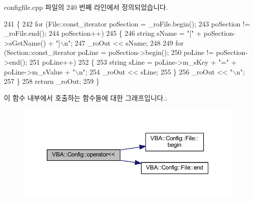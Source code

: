 configfile.\+cpp 파일의 240 번째 라인에서 정의되었습니다.


\begin{DoxyCode}
241 \{
242   \textcolor{keywordflow}{for} (File::const\_iterator poSection = \_roFile.begin();
243        poSection != \_roFile.end();
244        poSection++)
245   \{
246     \textcolor{keywordtype}{string} sName = \textcolor{stringliteral}{"["} + poSection->sGetName() + \textcolor{stringliteral}{"]\(\backslash\)n"};
247     \_roOut << sName;
248 
249     \textcolor{keywordflow}{for} (Section::const\_iterator poLine = poSection->begin();
250          poLine != poSection->end();
251          poLine++)
252     \{
253       \textcolor{keywordtype}{string} sLine = poLine->m\_sKey + \textcolor{stringliteral}{"="} + poLine->m\_sValue + \textcolor{stringliteral}{"\(\backslash\)n"};
254       \_roOut << sLine;
255     \}
256     \_roOut << \textcolor{stringliteral}{"\(\backslash\)n"};
257   \}
258   \textcolor{keywordflow}{return} \_roOut;
259 \}
\end{DoxyCode}
이 함수 내부에서 호출하는 함수들에 대한 그래프입니다.\+:
\nopagebreak
\begin{figure}[H]
\begin{center}
\leavevmode
\includegraphics[width=350pt]{namespace_v_b_a_1_1_config_ae8f486bb30184451079a550ba9de3d7e_cgraph}
\end{center}
\end{figure}
